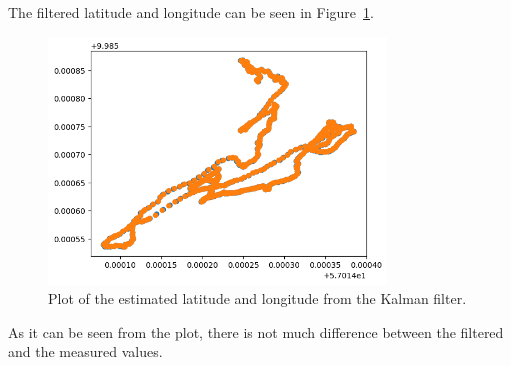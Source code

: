 The filtered latitude and longitude can be seen in Figure~\ref{fig:kalman-filter-lat-long}.
\begin{figure}[H]
    \centering
    \includegraphics[width=0.8\textwidth]{chapters/05Results/figures/lat_long_filtered}
    \caption{Plot of the estimated latitude and longitude from the Kalman filter.}
    \label{fig:kalman-filter-lat-long}
\end{figure}

As it can be seen from the plot, there is not much difference between the filtered and the measured values.



